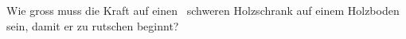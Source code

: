 Wie gross muss die Kraft auf einen \mScO\ schweren Holzschrank auf einem Holzboden sein, damit er zu rutschen beginnt?

